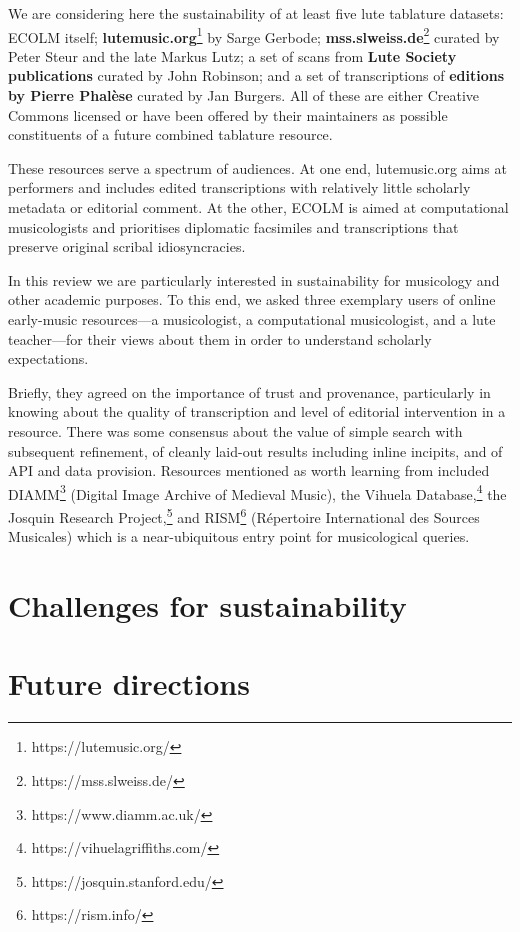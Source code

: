 \documentclass[sigconf]{acmart}
\begin{document}
\begin{sloppypar}
  We are considering here the sustainability of at least five lute
  tablature datasets: ECOLM itself; {\bf
    lutemusic.org}\footnote{https://lutemusic.org/} by Sarge Gerbode;
  {\bf mss.slweiss.de}\footnote{https://mss.slweiss.de/} curated by
  Peter Steur and the late Markus Lutz; a set of scans from {\bf Lute
    Society publications} curated by John Robinson; and a set of
  transcriptions of {\bf editions by Pierre Phal\`ese} curated by Jan
  Burgers. All of these are either Creative Commons licensed or have
  been offered by their maintainers as possible constituents of a
  future combined tablature resource.

  These resources serve a spectrum of audiences. At one end,
  lutemusic.org aims at performers and includes edited transcriptions
  with relatively little scholarly metadata or editorial comment. At
  the other, ECOLM is aimed at computational musicologists and
  prioritises diplomatic facsimiles and transcriptions that preserve
  original scribal idiosyncracies.

  In this review we are particularly interested in sustainability for
  musicology and other academic purposes. To this end, we asked three
  exemplary users of online early-music resources---a musicologist, a
  computational musicologist, and a lute teacher---for their views
  about them in order to understand scholarly expectations.

  Briefly, they agreed on the importance of trust and provenance,
  particularly in knowing about the quality of transcription and level
  of editorial intervention in a resource. There was some consensus
  about the value of simple search with subsequent refinement, of
  cleanly laid-out results including inline incipits, and of API and
  data provision. Resources mentioned as worth learning from included
  DIAMM\footnote{https://www.diamm.ac.uk/} (Digital Image Archive of
  Medieval Music), the Vihuela
  Database,\footnote{https://vihuelagriffiths.com/} the Josquin
  Research Project,\footnote{https://josquin.stanford.edu/} and
  RISM\footnote{https://rism.info/} (R\'epertoire International des
  Sources Musicales) which is a near-ubiquitous entry point for
  musicological queries.
  
  \section{Challenges for sustainability}\label{challenges}

  \section{Future directions}


\end{sloppypar}
\end{document}

